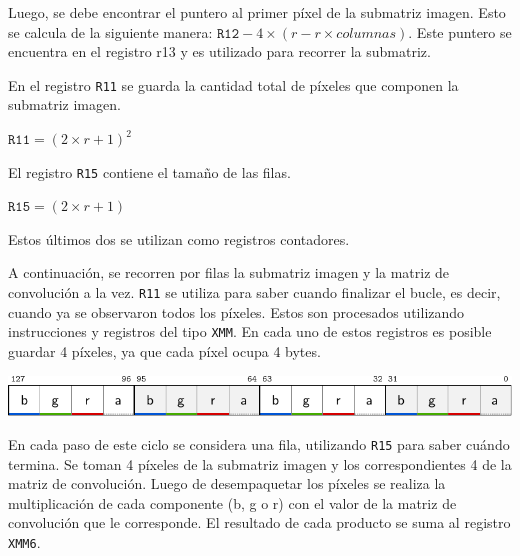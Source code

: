         Luego, se debe encontrar el puntero al primer píxel de la submatriz imagen. Esto se calcula de la siguiente manera: $\mathtt{R12} - 4 \times (r - r \times columnas)$. Este puntero se encuentra en el registro r13 y es utilizado para recorrer la submatriz. 

        En el registro \texttt{R11} se guarda la cantidad total de píxeles que componen la submatriz imagen. 

              $\mathtt{R11} = (2 \times r + 1)^{2}$  
        
        El registro \texttt{R15} contiene el tamaño de las filas.
        
              $\mathtt{R15} = (2 \times r + 1)$

        Estos últimos dos se utilizan como registros contadores.

        A continuación, se recorren por filas la submatriz imagen y la matriz de convolución a la vez. \texttt{R11} se utiliza para saber cuando finalizar el bucle, es decir, cuando ya se observaron todos los píxeles. Estos son procesados utilizando instrucciones  y registros del tipo \texttt{XMM}. En cada uno de estos registros es posible guardar 4 píxeles, ya que cada píxel ocupa 4 bytes. 

        \begin{center}
           \includegraphics{imagenes/blur-registros-1.pdf}
        \end{center}
  
        En cada paso de este ciclo se considera una fila, utilizando \texttt{R15} para saber cuándo termina. Se toman 4 píxeles de la submatriz imagen y los correspondientes 4 de la matriz de convolución. Luego de desempaquetar los píxeles se realiza la multiplicación de cada componente (\textsf{b}, \textsf{g} o \textsf{r}) con el valor de la matriz de convolución que le corresponde. El resultado de cada producto se suma al registro \texttt{XMM6}. 

        \vspace{\baselineskip}

